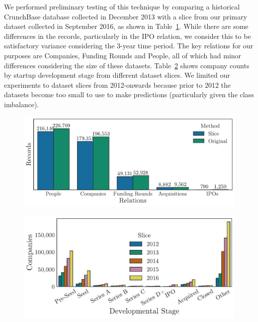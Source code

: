 \documentclass[../thesis/thesis.tex]{subfiles}
\begin{document}
We performed preliminary testing of this technique by comparing a historical CrunchBase database collected in December 2013 with a slice from our primary dataset collected in September 2016, as shown in Table~\ref{fig:evaluation:2013_slice_comparison}. While there are some differences in the records, particularly in the IPO relation, we consider this to be satisfactory variance considering the 3-year time period. The key relations for our purposes are Companies, Funding Rounds and People, all of which had minor differences considering the size of these datasets. Table~\ref{fig:evaluation:slice_counts_over_time} shows company counts by startup development stage from different dataset slices. We limited our experiments to dataset slices from 2012-onwards because prior to 2012 the datasets become too small to use to make predictions (particularly given the class imbalance).

\begin{figure}[!htb]
    \centering
    \includegraphics[width=\textwidth]{../figures/evaluation/2013_slice_comparison}
    \caption[Dataset slice compared with original dataset]{}
    \label{fig:evaluation:2013_slice_comparison}
\end{figure}

\begin{figure}[!htb]
    \centering
    \includegraphics[width=\textwidth]{../figures/evaluation/slice_counts_over_time}
    \caption[Dataset counts over time]{}
    \label{fig:evaluation:slice_counts_over_time}
\end{figure}
\end{document}
